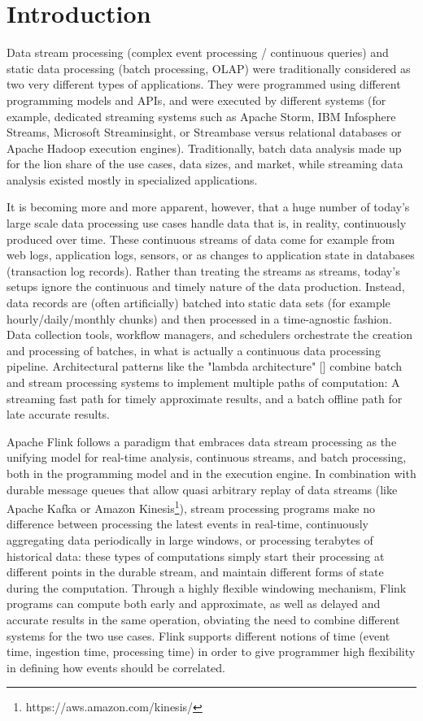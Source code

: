 

\section{Introduction}
\label{sec:intro}
Data stream processing (complex event processing / continuous queries) and static data processing (batch processing, OLAP) were traditionally considered as two very different types of applications. They were programmed using different programming models and APIs, and were executed by different systems (for example, dedicated streaming systems such as  Apache Storm, IBM Infosphere Streams, Microsoft Streaminsight, or Streambase versus relational databases or Apache Hadoop execution engines). Traditionally, batch data analysis made up for the lion share of the use cases, data sizes, and market, while streaming data analysis existed mostly in specialized applications.

It is becoming more and more apparent, however, that a huge number of today's large scale data processing use cases handle data that is, in reality, continuously produced over time. These continuous streams of data come for example from web logs, application logs, sensors, or as changes to application state in databases (transaction log records). Rather than treating the streams as streams, today's setups ignore the continuous and timely nature of the data production. Instead, data records are (often artificially) batched into static data sets (for example hourly/daily/monthly chunks) and then processed in a time-agnostic fashion. Data collection tools, workflow managers, and schedulers orchestrate the creation and processing of batches, in what is actually a continuous data processing pipeline. Architectural patterns like the "lambda architecture" [] combine batch and stream processing systems to implement multiple paths of computation: A streaming fast path for timely approximate results, and a batch offline path for late accurate results.

Apache Flink follows a paradigm that embraces data stream processing as the unifying model for real-time analysis, continuous streams, and batch processing, both in the programming model and in the execution engine. In combination with durable message queues that allow quasi arbitrary replay of data streams (like Apache Kafka \cite{CUSTOM:web/Kafka} or Amazon Kinesis\footnote{https://aws.amazon.com/kinesis/}), stream processing programs make no difference between processing the latest events in real-time, continuously aggregating data periodically in large windows, or processing terabytes of historical data: these types of computations simply start their processing at different points in the durable stream, and maintain different forms of state during the computation. Through a highly flexible windowing mechanism, Flink programs can compute both early and approximate, as well as delayed and accurate results in the same operation, obviating the need to combine different systems for the two use cases. Flink supports different notions of time (event time, ingestion time, processing time) in order to give programmer high flexibility in defining how events should be correlated.
 
